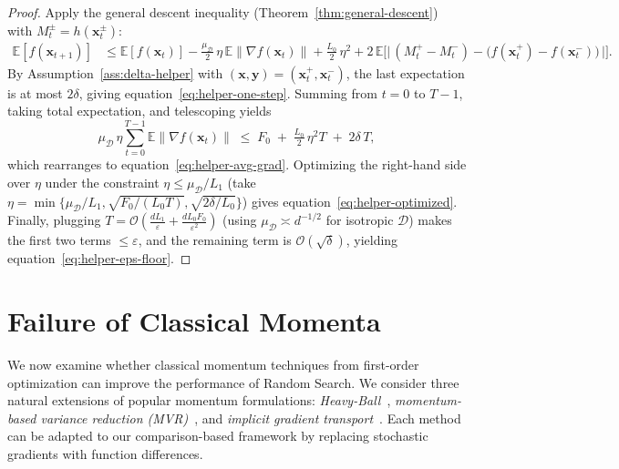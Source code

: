 \documentclass[twoside]{article}
\theoremstyle{plain}
\theoremstyle{definition}
\theoremstyle{remark}
\def\eqref#1{equation~\ref{#1}}
\def\cO{{\mathcal{O}}}
\def\cD{{\mathcal{D}}}
\def\vx{{\bm{x}}}
\def\vy{{\bm{y}}}
\newcommand{\E}{\mathbb{E}}
\begin{document}
\begin{proof}
Apply the general descent inequality
(Theorem~\ref{thm:general-descent}) with $M_t^\pm=h(\vx_t^\pm)$:
\begin{align*}
\E[f(\vx_{t+1})]
&\le
\E[f(\vx_t)]
- \tfrac{\mu_{\cD}}{2}\,\eta\,\E\|\nabla f(\vx_t)\|
+ \tfrac{L_0}{2}\,\eta^2
+ 2\,\E\!\Big[
  \big|\, (M_t^+ - M_t^-)-\big(f(\vx_t^+) - f(\vx_t^-)\big)\,\big|
\Big].
\end{align*}
By Assumption~\ref{ass:delta-helper} with $(\vx,\vy)=(\vx_t^+,\vx_t^-)$, the
last expectation is at most $2\delta$, giving
\eqref{eq:helper-one-step}. Summing from $t=0$ to $T-1$, taking total
expectation, and telescoping yields
\[
\mu_{\cD}\,\eta \sum_{t=0}^{T-1}\E\|\nabla f(\vx_t)\|
\;\le\;
F_0 \;+\; \tfrac{L_0}{2}\,\eta^2 T \;+\; 2\delta\,T,
\]
which rearranges to \eqref{eq:helper-avg-grad}. Optimizing the right-hand side
over $\eta$ under the constraint $\eta\le \mu_{\cD}/L_1$ (take
$\eta=\min\{\mu_{\cD}/L_1,\sqrt{F_0/(L_0T)},\sqrt{2\delta/L_0}\}$) gives
\eqref{eq:helper-optimized}. Finally, plugging
$T=\cO(\tfrac{dL_1}{\varepsilon}+\tfrac{dL_0 F_0}{\varepsilon^2})$ (using
$\mu_{\cD}\asymp d^{-1/2}$ for isotropic $\cD$) makes the first two terms
$\le \varepsilon$, and the remaining term is $\cO(\sqrt{\delta})$, yielding
\eqref{eq:helper-eps-floor}.
\end{proof}


\section{Failure of Classical Momenta}
\label{sec:failure-momentum}

We now examine whether classical momentum techniques from first-order
optimization can improve the performance of Random Search.
We consider three natural extensions of popular momentum formulations:
\emph{Heavy-Ball}~\cite{polyak1964some},
\emph{momentum-based variance reduction (MVR)}~\cite{cutkosky2019momentum},
and \emph{implicit gradient transport}~\cite{arnold2019reducing}.
Each method can be adapted to our comparison-based framework by
replacing stochastic gradients with function differences.
\end{document}
